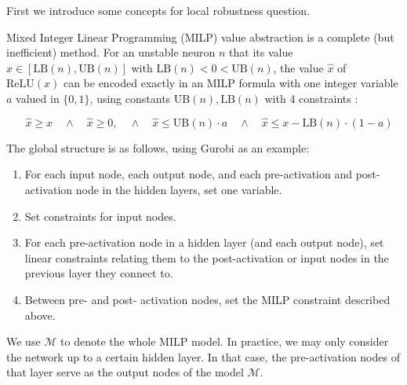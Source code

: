 \documentclass{llncs}
\newcommand{\UB}{\mathrm{UB}}
\newcommand{\LB}{\mathrm{LB}}
\newcommand{\ReLU}{\mathrm{ReLU}}
\begin{document}
	First we introduce some concepts for local robustness question.
	
	Mixed Integer Linear Programming (MILP) value abstraction is a complete (but inefficient) method. 
	For an unstable neuron $n$ that its value $x \in [\LB(n),\UB(n)]$ with $\LB(n)<0<\UB(n)$, the value $\hat{x}$ of $\ReLU(x)$ can be encoded exactly in an MILP formula with one 
	integer variable $a$ valued in $\{0,1\}$, using constants $\UB(n),\LB(n)$ with 4 constraints \cite{MILP}:
	
	\vspace{-0.4cm}
	\begin{equation}\quad \hat{x} \geq x \quad \wedge \quad \hat{x} \geq 0, \quad \wedge \quad \hat{x} \leq \UB(n) \cdot a \quad \wedge \quad \hat{x} \leq x-\LB(n) \cdot (1-a)
		\label{eq11}
	\end{equation}
	
	
	The global structure is as follows, using Gurobi as an example:
	\begin{enumerate}
		\item For each input node, each output node, and each pre-activation and post-activation node in the hidden layers,  set one variable. 
		\item Set constraints for input nodes.
		\item For each pre-activation node in a hidden layer (and each output node), set linear constraints relating them to the post-activation or input nodes in the previous layer they connect to.
		\item Between pre- and post- activation nodes, set the MILP constraint described above.
	\end{enumerate} We use $\mathcal{M}$ to denote the whole MILP model. In practice, we may only consider the network up to a certain hidden layer. In that case, the pre-activation nodes of that layer serve as the output nodes of the model $\mathcal{M}$.
	
\end{document}
